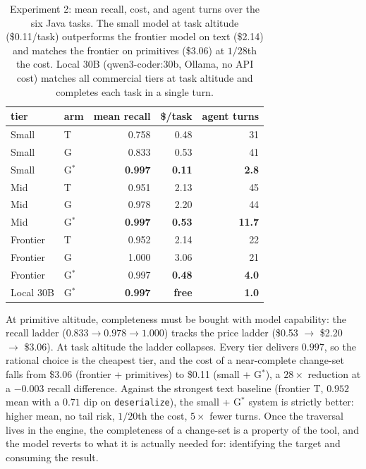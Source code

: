\documentclass[11pt]{article}
\newcommand{\code}[1]{\texttt{#1}}
\newcommand{\gstar}{G$^{*}$}
\begin{document}
\begin{table}[ht]
\centering
\small
\begin{tabular}{llrrr}
\toprule
tier & arm & mean recall & \$/task & agent turns \\
\midrule
Small    & T        & 0.758 & 0.48 & 31 \\
Small    & G        & 0.833 & 0.53 & 41 \\
Small    & \gstar{} & \textbf{0.997} & \textbf{0.11} & \textbf{2.8} \\
\addlinespace
Mid      & T        & 0.951 & 2.13 & 45 \\
Mid      & G        & 0.978 & 2.20 & 44 \\
Mid      & \gstar{} & \textbf{0.997} & \textbf{0.53} & \textbf{11.7} \\
\addlinespace
Frontier & T        & 0.952 & 2.14 & 22 \\
Frontier & G        & 1.000 & 3.06 & 21 \\
Frontier & \gstar{} & 0.997 & \textbf{0.48} & \textbf{4.0} \\
\addlinespace
Local 30B & \gstar{} & \textbf{0.997} & \textbf{free} & \textbf{1.0} \\
\bottomrule
\end{tabular}
\caption{Experiment 2: mean recall, cost, and agent turns over the six Java
tasks. The small model at task altitude (\$0.11/task) outperforms the frontier
model on text (\$2.14) and matches the frontier on primitives (\$3.06) at
$1/28$th the cost. Local 30B (qwen3-coder:30b, Ollama, no API cost) matches
all commercial tiers at task altitude and completes each task in a single turn.}
\label{tab:altcost}
\end{table}

At primitive altitude, completeness must be bought with model capability:
the recall ladder ($0.833 \to 0.978 \to 1.000$) tracks the price ladder
(\$0.53 $\to$ \$2.20 $\to$ \$3.06). At task altitude the ladder collapses. Every
tier delivers $0.997$, so the rational choice is the cheapest tier, and the
cost of a near-complete change-set falls from \$3.06 (frontier + primitives) to
\$0.11 (small + \gstar{}), a $28\times$ reduction at a $-0.003$ recall
difference. Against the strongest text baseline (frontier T, $0.952$ mean with a
$0.71$ dip on \code{deserialize}), the small + \gstar{} system is
strictly better: higher mean, no tail risk, $1/20$th the cost, $5\times$
fewer turns. Once the traversal lives in the engine, the completeness of a
change-set is a property of the tool, and the model reverts to what it is
actually needed for: identifying the target and consuming the result.
\end{document}
